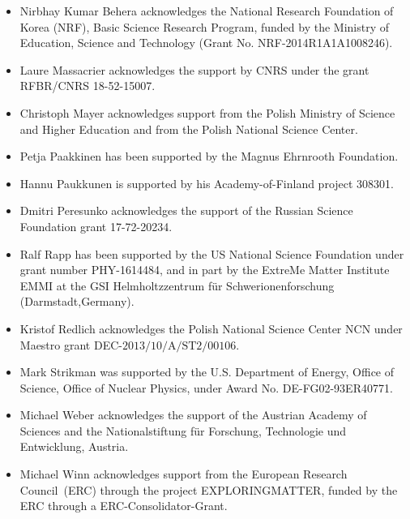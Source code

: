 \begin{itemize}
\item Nirbhay Kumar Behera acknowledges the National Research Foundation of Korea (NRF), Basic Science Research Program, funded by the Ministry of Education, Science and Technology (Grant No. NRF-2014R1A1A1008246). %
\item Laure Massacrier acknowledges the support by CNRS under the grant RFBR/CNRS 18-52-15007.%
\item Christoph Mayer acknowledges support from the Polish Ministry of Science and Higher Education and from the Polish National Science Center.%
\item Petja Paakkinen has been supported by the Magnus Ehrnrooth Foundation.%
\item Hannu Paukkunen is supported by his Academy-of-Finland project 308301.%
\item Dmitri Peresunko acknowledges the support of the Russian Science Foundation grant 17-72-20234.%
\item Ralf Rapp has been supported by the US National Science Foundation under grant number PHY-1614484, and in part by the ExtreMe Matter Institute EMMI at the GSI Helmholtzzentrum f\"{u}r Schwerionenforschung (Darmstadt,Germany).%
\item Kristof Redlich acknowledges the Polish National Science Center NCN under Maestro grant DEC-$\mathrm{2013/10/A/ST2/00106}$.  %
\item Mark Strikman was supported by the U.S. Department of Energy, Office of Science, Office of Nuclear Physics, under Award No. DE-FG02-93ER40771.%
\item Michael Weber acknowledges the support of the Austrian Academy of Sciences and the Nationalstiftung f\"ur Forschung, Technologie und Entwicklung, Austria.%
\item Michael Winn acknowledges support from the European Research Council~(ERC) through the project EXPLORINGMATTER, funded by the ERC through a ERC-Consolidator-Grant.%

\end{itemize}
